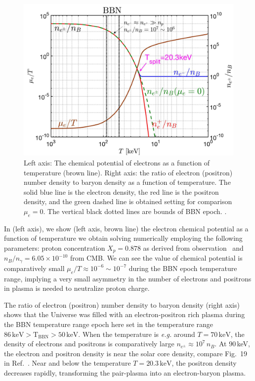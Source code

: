 \begin{figure}
\centerline{\includegraphics[width=0.90\linewidth]{plots/May152023_EPDensity_Chemical}}
\caption{Left axis: The chemical potential of electrons as a function of temperature (brown line). Right axis: the ratio of electron (positron) number density to baryon density as a function of temperature. The solid blue line is the electron density, the red  line is the positron density, and the green dashed line is obtained setting for comparison $\mu_e=0$. The vertical black dotted lines are bounds of BBN epoch. . }
\label{BBN:Electron}
\end{figure}

In  (left axis), we show (left axis, brown line) the electron chemical potential as a function of temperature we obtain solving  numerically employing the following parameters: proton concentration $X_p=0.878$ as derived from observation~\cite{ParticleDataGroup:2022pth} and $n_B/n_\gamma=6.05\times10^{-10}$ from CMB. We can see the value of chemical potential is comparatively small $\mu_e/T\approx10^{-6}\sim10^{-7}$ during the BBN epoch temperature range, implying a very small asymmetry in the number of electrons and positrons in plasma is needed to neutralize proton charge. 

The ratio of electron (positron) number density to baryon density (right axis) shows that the Universe was filled with an electron-positron rich plasma during the BBN temperature range epoch here set in the temperature range $86\,\mathrm{keV}>\mathrm{T_{BBN}}>50\,\mathrm{keV}$. When the temperature is {\it e.g.\/} around $T=70\,\mathrm{keV}$, the density of electrons and positrons is comparatively large $n_{e^\pm}\approx10^7\,n_B$. At $90$\,keV, the electron and positron density is near the solar core density, compare Fig.~19 in Ref.~\cite{Rafelski:2023emw}. Near and below   the temperature  $T=20.3\,\mathrm{keV}$, the positron density decreases rapidly, transforming the pair-plasma into an electron-baryon plasma.

